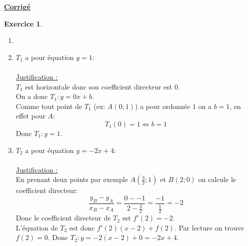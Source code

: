 \documentclass{exam}
\theoremstyle{definition}
\newtheorem{exercice}{Exercice}
\begin{document}
% 
% 
% 
    
\newpage

\begin{center}
    \LARGE
    \textbf{\underline{Corrigé}}
\end{center}
\setcounter{exercice}{0}

\begin{exercice}
    \begin{enumerate}
        \item[]
        \item $T_1$ a pour équation $y = 1$:\\
        \\
        \underline{Justification :}\\
        $T_1$ est horizontale donc son coefficient directeur est $0$.\\
        On a donc $T_1: y = 0x + b$.\\
        Comme tout point de $T_1$ (ex: $A(0; 1)$) a pour ordonnée $1$ on a $b = 1$, en effet pour $A$:
        $$
            T_1(0) = 1 \iff b = 1
        $$
        Donc $T_1: y = 1$.
        \item $T_2$ a pour équation $y = -2x + 4$:\\
        \\
        \underline{Justification :}\\
        En prenant deux points par exemple $A(\frac{3}{2}; 1)$ et $B(2; 0)$ on calcule le coefficient directeur:
        $$
            \frac{y_B - y_A}{x_B - x_A} = \frac{0 - -1}{2 - \frac{3}{2}} = \frac{-1}{\frac{1}{2}} = -2
        $$
        Donc le coefficient directeur de $T_2$ est $f'(2) = -2$.\\
        L'équation de $T_2$ est donc $f'(2)(x-2) + f(2)$. Par lecture on trouve $f(2) = 0$.
        Donc $T_2: y = -2(x-2) + 0 = -2x + 4$.
    \end{enumerate}
\end{exercice}
\end{document}
